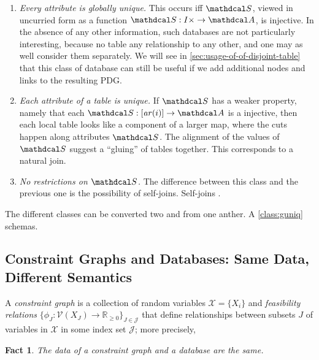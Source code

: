 \documentclass{article}
\theoremstyle{plain}
\newtheorem{fact}[theorem]{Fact}
\theoremstyle{definition}
\theoremstyle{remark}
\newcommand{\Attrs}{\mathdcal A}
\newcommand{\sch}{\mathdcal S}%
\newcommand{\arity}{\mathit{ar}}
\newcommand{\V}{\mathcal V}
\begin{document}
\begin{enumerate}[nosep, label={\textbf{Class \arabic*:}},ref={class \arabic*}]

	\item %
		\textit{Every attribute is globally unique.}
		This occurs iff $\sch$, viewed in uncurried form as a function $\sch : I \times \to \Attrs$, is injective. 
		In the absence of any other information, such databases are not particularly interesting, because no table any relationship to any other, and one may as well consider them separately. We will see in \cref{sec:usage-of-of-disjoint-table} that this class of database can still be useful if we add additional nodes and links to the resulting PDG.
		\label{class:guniq}
				
	\item %
		\textit{Each attribute of a table is unique.}
		If $\sch$ has a weaker property, namely that each $\sch : [\arity(i)] \to \Attrs$ is a injective, then each local table looks like a component of a larger map, where the cuts happen along attributes $\sch$. The alignment of the values of $\sch$ suggest a ``gluing'' of tables together. This corresponds to a natural join. 
		\label{class:luniq}
	\item \textit{No restrictions on $\sch$.} The difference between this class and the previous one is the possibility of self-joins. Self-joins \cite{DS04}.
		\label{class:nuniq}
\end{enumerate}

	The different classes can be converted two and from one anther. A \ref{class:guniq} schemas.
	
\subsection{Constraint Graphs and Databases: Same Data, Different Semantics}
\begin{defn}
	A \emph{constraint graph}  is a collection of random variables
	$\mathcal X = \{X_i\}$ and  \emph{feasibility relations}
	$\{\phi_J\colon \V(X_J) \to \mathbb R_{\geq0}\}_{J \in
		\mathcal J }$
	that define relationships between subsets $J$ of variables in
	$\mathcal X$ in some index set $\mathcal J$;
	more precisely,
\end{defn}
\begin{fact}
	The data of a constraint graph and a database are the same.
\end{fact}
\end{document}

